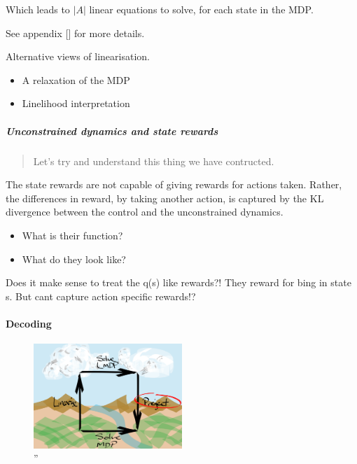 Which leads to \(|A|\) linear equations to solve, for each state in the
MDP.

See appendix {[}{]} for more details.

Alternative views of linearisation.

\begin{itemize}
\tightlist
\item
  A relaxation of the MDP
\item
  Linelihood interpretation
\end{itemize}

\hypertarget{unconstrained-dynamics-and-state-rewards}{%
\subparagraph{Unconstrained dynamics and state
rewards}\label{unconstrained-dynamics-and-state-rewards}}

\begin{quote}
Let's try and understand this thing we have contructed.
\end{quote}

The state rewards are not capable of giving rewards for actions taken.
Rather, the differences in reward, by taking another action, is captured
by the KL divergence between the control and the unconstrained dynamics.

\begin{itemize}
\tightlist
\item
  What is their function?
\item
  What do they look like?
\end{itemize}

Does it make sense to treat the q(s) like rewards?! They reward for bing
in state s. But cant capture action specific rewards!?

\hypertarget{decoding}{%
\paragraph{Decoding}\label{decoding}}

\begin{figure}
\centering
\includegraphics[width=0.5\textwidth,height=0.5\textheight]{../../pictures/drawings/abstract-representations-project.png}
\caption{''}
\end{figure}

